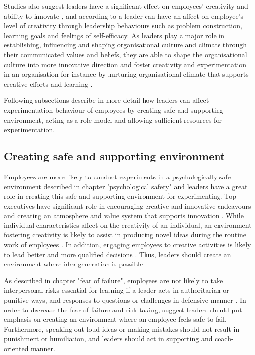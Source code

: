  Studies also suggest leaders have a significant effect on employees' creativity and ability to innovate \citep{mumford2002leading,jung2001transformational,amabile1998kill,hennessey19881}, and according to \citet{redmond1993putting} a leader can have an affect on employee's level of creativity through leadership behaviours such as problem construction, learning goals and feelings of self-efficacy. As leaders play a major role in establishing, influencing and shaping organisational culture and climate through their communicated values and beliefs, they are able to shape the organisational culture into more innovative direction and foster creativity and experimentation in an organisation \citep{jung2003role,schein2010organizational} for instance by nurturing organisational climate that supports creative efforts and learning \citep{yukl2002leadership}. 

Following subsections describe in more detail how leaders can affect experimentation behaviour of employees by creating safe and supporting environment, acting as a role model and allowing sufficient resources for experimentation. 

\subsection{Creating safe and supporting environment}
Employees are more likely to conduct experiments in a psychologically safe environment described in chapter "psychological safety" and leaders have a great role in creating this safe and supporting environment for experimenting. Top executives have significant role in encouraging creative and innovative endeavours and creating an atmosphere and value system that supports innovation \citep{quinn1985managing}. While individual characteristics affect on the creativity of an individual, an environment fostering creativity is likely to assist in producing novel ideas during the routine work of employees \citep{amabile1996assessing}. In addition, engaging employees to creative activities is likely to lead better and more qualified decisions \citep{shalley2004leaders}. Thus, leaders should create an environment where idea generation is possible \citep{andrews1970social}.

As described in chapter "fear of failure", employees are not likely to take interpersonal risks essential for learning if a leader acts in authoritarian or punitive ways, and responses to questions or challenges in defensive manner \citep{edmondson1999psychological}. In order to decrease the fear of failure and risk-taking, \citet{amabile2008creativity} suggest leaders should put emphasis on creating an environment where an employee feels safe to fail. Furthermore, speaking out loud ideas or making mistakes should not result in punishment or humiliation, and leaders should act in supporting and coach-oriented manner\citep{edmondson1999psychological}.

